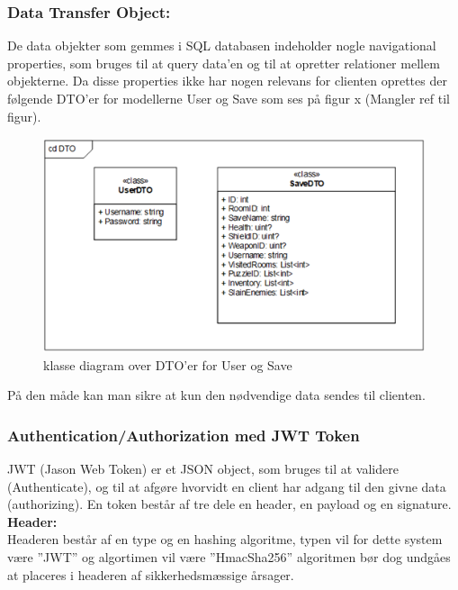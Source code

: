 \subsubsection{Data Transfer Object:}

De data objekter som gemmes i SQL databasen indeholder nogle navigational properties, som bruges til at query data’en og til at opretter relationer mellem objekterne. Da disse properties ikke har nogen relevans for clienten oprettes der følgende DTO’er for modellerne User og Save som ses på figur x (Mangler ref til figur).\\

\begin{figure}[h]
\centering
\includegraphics[width = \textwidth]{02-Body/Images/Backend_DTO.PNG}
\caption{klasse diagram over DTO'er for User og Save}
\label{fig:Arkitektur-Backend-DTO}
\end{figure}

På den måde kan man sikre at kun den nødvendige data sendes til clienten.\\

\subsubsection{Authentication/Authorization med JWT Token}
JWT (Jason Web Token) er et JSON object, som bruges til at validere (Authenticate), og til at afgøre hvorvidt en client har adgang til den givne data (authorizing). En token består af tre dele en header, en payload og en signature.\\

\textbf{Header:}\\
Headeren består af en type og en hashing algoritme, typen vil for dette system være ”JWT” og algortimen vil være ”HmacSha256” algoritmen bør dog undgåes at placeres i headeren af sikkerhedsmæssige årsager.\\

